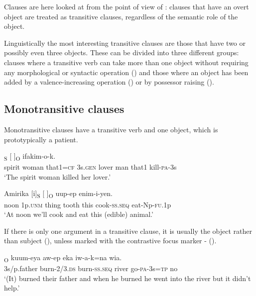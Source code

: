 Clauses are here looked at from the point of view of : clauses that have an overt object are treated as transitive clauses, regardless of the semantic role of the object. 

Linguistically the most interesting transitive clauses are those that have two or possibly even three objects. These can be divided into three different groups: clauses where a transitive verb can take more than one object without requiring any morphological or syntactic operation () and those where an object has been added by a valence-increasing operation () or by possessor raising ().

\subsection{Monotransitive clauses}
{}
Monotransitive clauses have a transitive verb and one object, which is prototypically a patient. 

\ea%
\label{ex:x937}
\gll [Sawur  emeria  nain=ke]\textsubscript{S}  [   ]\textsubscript{O}  ifakim-o-k. \\
     spirit  woman  that1=\textsc{cf}  3s.\textsc{gen}  lover  man  that1  kill-\textsc{pa}-3s \\
\glt `The spirit woman killed her lover.'
\z

\ea%
\label{ex:x939}
\gll Amirika  [i]\textsubscript{S}  [  ]\textsubscript{O}  uup-ep enim-i-yen. \\
     noon  1p.\textsc{unm}  thing  tooth  this  cook-\textsc{ss}.\textsc{seq} eat-Np-\textsc{fu}.1p \\
\glt `At noon we'll cook and eat this (edible) animal.'
\z

If there is only one  argument in a transitive clause, it is usually the object rather than subject (), unless marked with the contrastive focus marker - ().

\ea%
\label{ex:x941}
\textsubscript{O}  kuum-eya  aw-ep  eka  iw-a-k=na  wia. \\
     3s/p.father  burn-2/3.\textsc{ds}  burn-\textsc{ss}.\textsc{seq}  river  go-\textsc{pa}-3s=\textsc{tp}  no \\
\glt `(It) burned their father and when he burned he went into the river but it didn't help.'
\z

